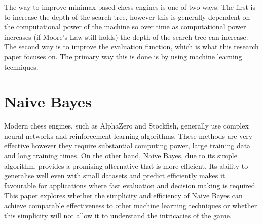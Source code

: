 The way to improve minimax-based chess engines is one of two ways. The first is to increase the depth of the search tree, however this is generally dependent on the computational power of the machine so over time as computational power increases (if Moore's Law still holds) the depth of the search tree can increase. The second way is to improve the evaluation function, which is what this research paper focuses on. The primary way this is done is by using machine learning techniques. 

\section{Naive Bayes}

Modern chess engines, such as AlphaZero and Stockfish, generally use complex neural networks and reinforcement learning algorithms. These methods are very effective however they require substantial computing power, large training data and long training times. On the other hand, Naive Bayes, due to its simple algorithm, provides a promising alternative that is more efficient. Its ability to generalise well even with small datasets and predict efficiently \cite{althnianImpactDatasetSize2021} makes it favourable for applications where fast evaluation and decision making is required. This paper explores whether the simplicity and efficiency of Naive Bayes can achieve comparable effectiveness to other machine learning techniques or whether this simplicity will not allow it to understand the intricacies of the game.


